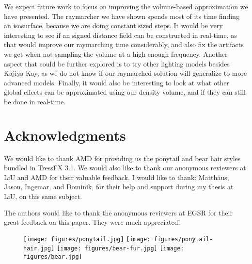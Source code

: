 \documentclass{egpubl}
\begin{document}
We expect future work to focus on improving the volume-based approximation we have presented. The raymarcher we have shown spends most of its time finding an isosurface, because we are doing constant sized steps. It would be very interesting to see if an signed distance field can be constructed in real-time, as that would improve our raymarching time considerably, and also fix the artifacts we get when not sampling the volume at a high enough frequency. Another aspect that could be further explored is to try other lighting models besides Kajiya-Kay, as we do not know if our raymarched solution will generalize to more advanced models. Finally, it would also be interesting to look at what other global effects can be approximated using our density volume, and if they can still be done in real-time.

\section*{Acknowledgments}

We would like to thank AMD for providing us the ponytail and bear hair styles bundled in TressFX 3.1. We would also like to thank our anonymous reviewers at LiU and AMD for their valuable feedback. I would like to thank: Matthäus, Jason, Ingemar, and Dominik, for their help and support during my thesis at LiU, on this same subject.

\noindent The authors would like to thank the anonymous reviewers at EGSR for their great feedback on this paper. They were much appreciated!

\nocite{*}

\printbibliography

\begin{figure}[H]
    \centering
    \texttt{[image: figures/ponytail.jpg]}
    \texttt{[image: figures/ponytail-hair.jpg]}
    \texttt{[image: figures/bear-fur.jpg]}
    \texttt{[image: figures/bear.jpg]}
\end{figure}
\end{document}
